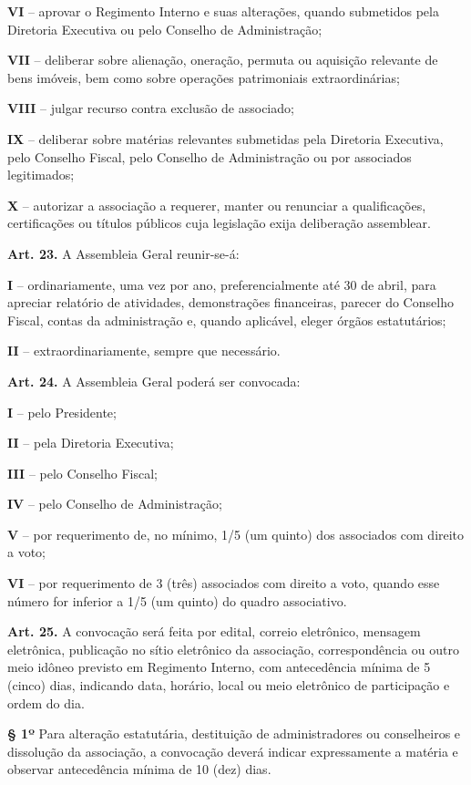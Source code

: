 \documentclass[11pt,a4paper]{article}
\begin{document}
\textbf{VI} -- aprovar o Regimento Interno e suas alterações, quando submetidos pela Diretoria Executiva ou pelo Conselho de Administração;

\textbf{VII} -- deliberar sobre alienação, oneração, permuta ou aquisição relevante de bens imóveis, bem como sobre operações patrimoniais extraordinárias;

\textbf{VIII} -- julgar recurso contra exclusão de associado;

\textbf{IX} -- deliberar sobre matérias relevantes submetidas pela Diretoria Executiva, pelo Conselho Fiscal, pelo Conselho de Administração ou por associados legitimados;

\textbf{X} -- autorizar a associação a requerer, manter ou renunciar a qualificações, certificações ou títulos públicos cuja legislação exija deliberação assemblear.

\textbf{Art. 23.} A Assembleia Geral reunir-se-á:

\textbf{I} -- ordinariamente, uma vez por ano, preferencialmente até 30 de abril, para apreciar relatório de atividades, demonstrações financeiras, parecer do Conselho Fiscal, contas da administração e, quando aplicável, eleger órgãos estatutários;

\textbf{II} -- extraordinariamente, sempre que necessário.

\textbf{Art. 24.} A Assembleia Geral poderá ser convocada:

\textbf{I} -- pelo Presidente;

\textbf{II} -- pela Diretoria Executiva;

\textbf{III} -- pelo Conselho Fiscal;

\textbf{IV} -- pelo Conselho de Administração;

\textbf{V} -- por requerimento de, no mínimo, 1/5 (um quinto) dos associados com direito a voto;

\textbf{VI} -- por requerimento de 3 (três) associados com direito a voto, quando esse número for inferior a 1/5 (um quinto) do quadro associativo.

\textbf{Art. 25.} A convocação será feita por edital, correio eletrônico, mensagem eletrônica, publicação no sítio eletrônico da associação, correspondência ou outro meio idôneo previsto em Regimento Interno, com antecedência mínima de 5 (cinco) dias, indicando data, horário, local ou meio eletrônico de participação e ordem do dia.

\textbf{§ 1º} Para alteração estatutária, destituição de administradores ou conselheiros e dissolução da associação, a convocação deverá indicar expressamente a matéria e observar antecedência mínima de 10 (dez) dias.
\end{document}
